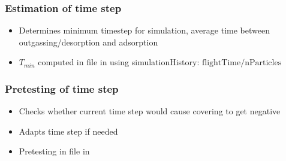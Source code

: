 \subsubsection{Estimation of time step }
\begin{itemize}[noitemsep,topsep=0pt]
\item Determines minimum timestep for simulation, average time between outgassing/desorption and adsorption
\item $T_{min}$ computed in  file in  using simulationHistory: $\text{flightTime}/\text{nParticles}$ 
\end{itemize}

\subsubsection{Pretesting of time step }
\begin{itemize}[noitemsep,topsep=0pt]
\item Checks whether current time step would cause covering to get negative
\item Adapts time step if needed
\item Pretesting in  file in 
\end{itemize}


